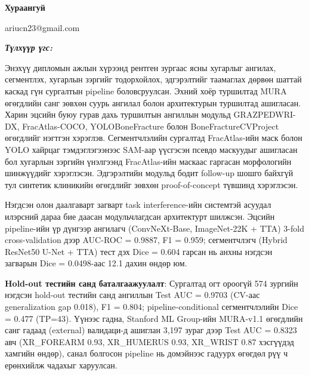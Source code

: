 

\begin{center}
{\scshape\Large \univname\par} %
{\scshape\large \facname\par}\vspace{0.5cm} %
{\huge\textbf{{Хураангуй}} \par}
\bigskip
{\Large{\ttitle} \par} %
\bigskip

{\normalsize \shortname \par} %
{\normalsize ariucn23@gmail.com \par}
\addressname

\end{center}

\textit{\textbf{Түлхүүр үгс: \keywordnames}}
\bigskip

Энэхүү дипломын ажлын хүрээнд рентген зургаас ясны хугарлыг ангилах, сегментлэх, хугарлын зэргийг тодорхойлох, эдгэрэлтийг таамаглах дөрвөн шаттай каскад гүн сургалтын pipeline боловсруулсан. Эхний хоёр туршилтад MURA өгөгдлийн санг зөвхөн суурь ангилал болон архитектурын туршилтад ашигласан. Харин эцсийн буюу гурав дахь туршилтын ангиллын модульд GRAZPEDWRI-DX, FracAtlas-COCO, YOLOBoneFracture болон BoneFractureCVProject өгөгдлийг нэгтгэн хэрэглэв. Сегментчлэлийн сургалтад FracAtlas-ийн маск болон YOLO хайрцаг тэмдэглэгээнээс SAM-аар үүсгэсэн псевдо маскуудыг ашигласан бол хугарлын зэргийн үнэлгээнд FracAtlas-ийн маскаас гаргасан морфологийн шинжүүдийг хэрэглэсэн. Эдгэрэлтийн модульд бодит follow-up шошго байхгүй тул синтетик клиникийн өгөгдлийг зөвхөн proof-of-concept түвшинд хэрэглэсэн.

Нэгдсэн олон даалгаварт загварт task interference-ийн системтэй асуудал илэрсний дараа бие даасан модульчлагдсан архитектурт шилжсэн. Эцсийн pipeline-ийн үр дүнгээр ангилагч (ConvNeXt-Base, ImageNet-22K + TTA) 3-fold cross-validation дээр AUC-ROC = 0.9887, F1 = 0.959; сегментчлэгч (Hybrid ResNet50 U-Net + TTA) тест дэх Dice = 0.604 гарсан нь анхны нэгдсэн загварын Dice = 0.0498-аас 12.1 дахин өндөр юм.

\textbf{Hold-out тестийн санд баталгаажуулалт}: Сургалтад огт ороогүй 574 зургийн нэгдсэн hold-out тестийн санд ангиллын Test AUC = 0.9703 (CV-аас generalization gap 0.018), F1 = 0.804; pipeline-conditional сегментчлэлийн Dice = 0.477 (TP=43). Үүнээс гадна, Stanford ML Group-ийн MURA-v1.1 өгөгдлийн санг гадаад (external) валидаци-д ашиглан 3{,}197 зураг дээр Test AUC = 0.8323 авч (XR\_FOREARM 0.93, XR\_HUMERUS 0.93, XR\_WRIST 0.87 хэсгүүдэд хамгийн өндөр), санал болгосон pipeline нь домэйнээс гадуурх өгөгдөл рүү ч ерөнхийлж чадахыг харуулсан.

